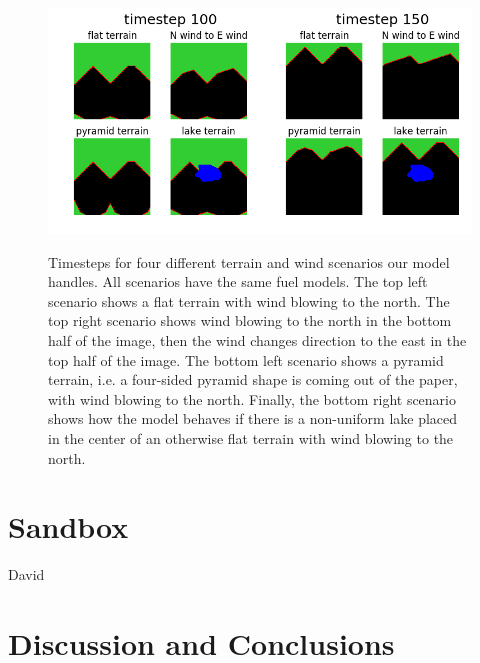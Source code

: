 \documentclass{article}
\begin{document}
\begin{figure}
\includegraphics[width=0.5\textwidth]{figures/multi_im099.png}\includegraphics[width=0.5\textwidth]{figures/multi_im149.png}
\caption{Timesteps for four different terrain and wind scenarios our model handles. All scenarios have the same fuel models. The top left scenario shows a flat terrain with wind blowing to the north. The top right scenario shows wind blowing to the north in the bottom half of the image, then the wind changes direction to the east in the top half of the image. The bottom left scenario shows a pyramid terrain, i.e. a four-sided pyramid shape is coming out of the paper, with wind blowing to the north. Finally, the bottom right scenario shows how the model behaves if there is a non-uniform lake placed in the center of an otherwise flat terrain with wind blowing to the north. \label{fig:modelims}}

\end{figure}


\section{Sandbox}
David
\section{Discussion and Conclusions}
\end{document}
